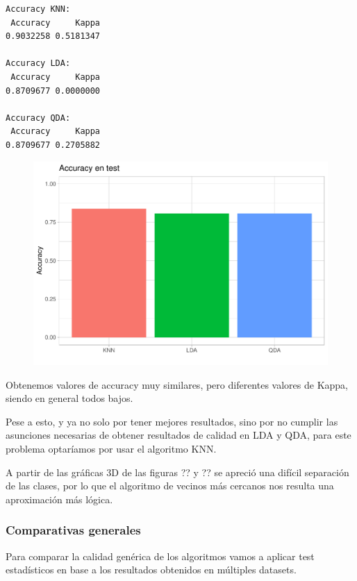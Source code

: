 \vspace{\baselineskip}

\begin{verbatim}
Accuracy KNN:
 Accuracy     Kappa 
0.9032258 0.5181347 

Accuracy LDA:
 Accuracy     Kappa 
0.8709677 0.0000000 

Accuracy QDA:
 Accuracy     Kappa 
0.8709677 0.2705882 
\end{verbatim}

\begin{figure}[H]\center\includegraphics[width=.9\linewidth]{img/Clasificacion_files/figure-latex/unnamed-chunk-33-1}\caption{}\end{figure}

Obtenemos valores de accuracy muy similares, pero diferentes valores de Kappa, siendo en general todos bajos.

\vspace{\baselineskip}

Pese a esto, y ya no solo por tener mejores resultados, sino por no cumplir las asunciones necesarias de obtener resultados de calidad en LDA y QDA, para este problema optaríamos por usar el algoritmo KNN.

A partir de las gráficas 3D de las figuras ?? y ?? se apreció una difícil separación de las clases, por lo que el algoritmo de vecinos más cercanos nos resulta una aproximación más lógica.

\subsubsection{Comparativas generales}

Para comparar la calidad genérica de los algoritmos vamos a aplicar test estadísticos en base a los resultados obtenidos en múltiples datasets.

